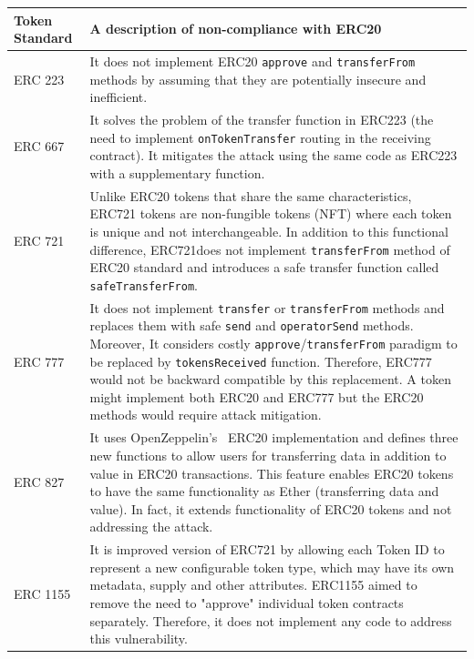 \begin{table}
\centering
\def\arraystretch{1.2}%
\begin{tabular}{|m{1.8cm}|m{14.5cm}|}
	\hline\centering
	\textbf{Token Standard} & \textbf{A description of non-compliance with ERC20}\\
	\hline\hline\centering
	ERC 223 \cite{Ref20} & It does not implement ERC20 \texttt{approve} and \texttt{transferFrom} methods by assuming that they are potentially insecure and inefficient.\\ 
	\hline\centering 
	ERC 667 \cite{Ref21} & It solves the problem of the transfer function in ERC223 (\ie the need to implement \texttt{onTokenTransfer} routing in the receiving contract). It mitigates the attack using the same code as ERC223 with a supplementary function.\\ 
	\hline\centering 
	ERC 721 \cite{Ref22} & Unlike ERC20 tokens that share the same characteristics, ERC721 tokens are non-fungible tokens (NFT) where each token is unique and not interchangeable. In addition to this functional difference, ERC721does not implement \texttt{transferFrom} method of ERC20 standard and introduces a safe transfer function called \texttt{safeTransferFrom}.\\ 
	\hline\centering
	ERC 777 \cite{Ref23} & It does not implement \texttt{transfer} or \texttt{transferFrom} methods and replaces them with safe \texttt{send} and \texttt{operatorSend} methods. Moreover, It considers costly \texttt{approve}/\texttt{transferFrom} paradigm to be replaced by \texttt{tokensReceived} function. Therefore, ERC777 would not be backward compatible by this replacement. A token might implement both ERC20 and ERC777 but the ERC20 methods would require attack mitigation.\\ 
	\hline\centering 
	ERC 827 \cite{Ref24} & It uses OpenZeppelin's~\cite{Ref10} ERC20 implementation and defines three new functions to allow users for transferring data in addition to value in ERC20 transactions. This feature enables ERC20 tokens to have the same functionality as Ether (transferring data and value). In fact, it extends functionality of ERC20 tokens and not addressing the attack. \\ 
	\hline\centering 
	ERC 1155 \cite{Ref25} & It is improved version of ERC721 by allowing each Token ID to represent a new configurable token type, which may have its own metadata, supply and other attributes. ERC1155 aimed to remove the need to "approve" individual token contracts separately. Therefore, it does not implement any code to address this vulnerability.\\ 

\end{tabular}
\end{table}
